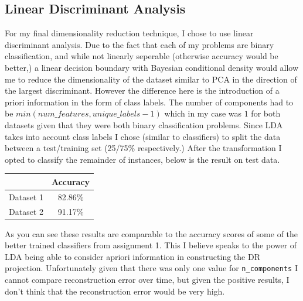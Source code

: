 \subsection{Linear Discriminant Analysis}\label{subsec:linear-discriminant-analysis}
For my final dimensionality reduction technique, I chose to use linear discriminant analysis.
Due to the fact that each of my problems are binary classification, and while not linearly seperable (otherwise accuracy would be better,)
a linear decision boundary with Bayesian conditional density would allow me to reduce the dimensionality of the dataset similar
to PCA in the direction of the largest discriminant.
However the difference here is the introduction of a priori information in the form of class labels.
The number of components had to be $min(num\_features, unique\_labels - 1)$ which in my case was $1$ for both datasets given
that they were both binary classification problems.
Since LDA takes into account class labels I chose (similar to classifiers) to split the data between a test/training set (25/75\% respectively.)
After the transformation I opted to classify the remainder of instances, below is the result on test data.
\begin{center}
    \begin{tabular}{|c| c |}
        \hline
        & Accuracy \\
        \hline
        \hline
        Dataset 1 & 82.86\%  \\
        \hline
        Dataset 2 & 91.17\%  \\
        \hline
    \end{tabular}
\end{center}
As you can see these results are comparable to the accuracy scores of some of the better trained classifiers from assignment 1.
This I believe speaks to the power of LDA being able to consider apriori information in constructing the DR projection.
Unfortunately given that there was only one value for \texttt{n\_components} I cannot compare reconstruction error over time,
but given the positive results, I don't think that the reconstruction error would be very high.